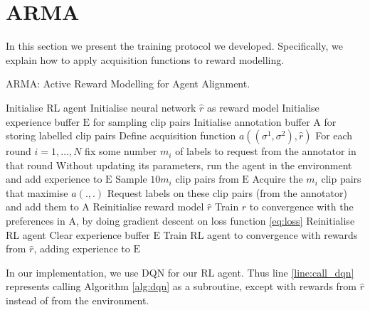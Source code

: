 \documentclass[11pt, a4paper, bibliography=totoc]{report}
\newcommand{\rp}{\hat{r}}
\newcommand{\expbuff}{\mathrm{E}}
\newcommand{\annbuff}{\mathrm{A}}
\begin{document}
\section{ARMA}
In this section we present the training protocol we developed. Specifically, we explain how to apply acquisition functions to reward modelling. %
\begin{algorithm}
	\caption{ARMA: Active Reward Modelling for Agent Alignment.}
	\label{alg:arma}
	\begin{algorithmic}[1]
        \State Initialise RL agent
		\State Initialise neural network $ \rp $ as reward model
		\State Initialise experience buffer $ \expbuff $ for sampling clip pairs
		\State Initialise annotation buffer $ \annbuff $ for storing labelled clip pairs
		\State Define acquisition function $ a((\sigma^1, \sigma^2), \rp) $
		\State For each round $ i=1, \dots, N $ fix some number $ m_i $ of labels to request from the annotator in that round
		\State Without updating its parameters, run the agent in the environment and add experience to $ \expbuff $
		\State Sample $ 10m_i $ clip pairs from $ \expbuff $
		\State Acquire the $ m_i $ clip pairs that maximise $ a(.,.) $
		\State Request labels on these clip pairs (from the annotator) and add them to $ \annbuff $
		\State Reinitialise reward model $ \rp $
		\State Train $ \rp $ to convergence with the preferences in $ \annbuff $, by doing gradient descent on loss function \ref{eq:loss}
		\State Reinitialise RL agent
		\State Clear experience buffer $ \expbuff $
		\State Train RL agent to convergence with rewards from $ \rp $, adding experience to $ \expbuff $ \label{line:call_dqn}
		\EndFor
	\end{algorithmic}
\end{algorithm}
In our implementation, we use DQN for our RL agent. Thus line \ref{line:call_dqn} represents calling Algorithm \ref{alg:dqn} as a subroutine, except with rewards from $ \rp $ instead of from the environment.
\end{document}
